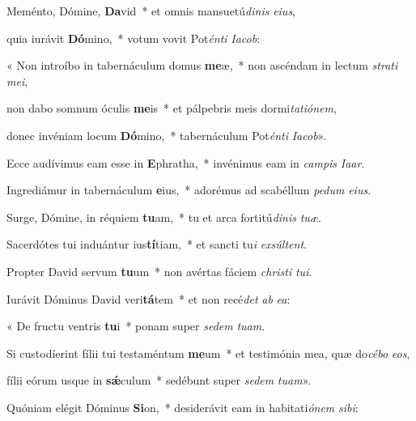 \item Meménto, Dómine, \textbf{Da}vid~* et omnis mansuetú\textit{dinis} \textit{eius},

\item quia iurávit \textbf{Dó}mino,~* votum vovit Pot\textit{énti} \textit{Iacob}:

\item « Non introíbo in tabernáculum domus \textbf{me}æ,~* non ascéndam in lectum \textit{strati} \textit{mei},

\item non dabo somnum óculis \textbf{me}is~* et pálpebris meis dormi\textit{tatiónem},

\item donec invéniam locum \textbf{Dó}mino,~* tabernáculum Pot\textit{énti} \textit{Iacob}».

\item Ecce audívimus eam esse in \textbf{E}phratha,~* invénimus eam in \textit{campis} \textit{Iaar}.

\item Ingrediámur in tabernáculum \textbf{e}ius,~* adorémus ad scabéllum \textit{pedum} \textit{eius}.

\item Surge, Dómine, in réquiem \textbf{tu}am,~* tu et arca fortitú\textit{dinis} \textit{tuæ}.

\item Sacerdótes tui induántur ius\textbf{tí}tiam,~* et sancti tu\textit{i} \textit{exsúltent}.

\item Propter David servum \textbf{tu}um~* non avértas fáciem \textit{christi} \textit{tui}.

\item Iurávit Dóminus David veri\textbf{tá}tem~* et non recé\textit{det} \textit{ab} \textit{ea}:

\item « De fructu ventris \textbf{tu}i~* ponam super \textit{sedem} \textit{tuam}.

\item Si custodíerint fílii tui testaméntum \textbf{me}um~* et testimónia mea, quæ do\textit{cébo} \textit{eos},

\item fílii eórum usque in \textbf{sǽ}culum~* sedébunt super \textit{sedem} \textit{tuam}».

\item Quóniam elégit Dóminus \textbf{Si}on,~* desiderávit eam in habitati\textit{ónem} \textit{sibi}:

